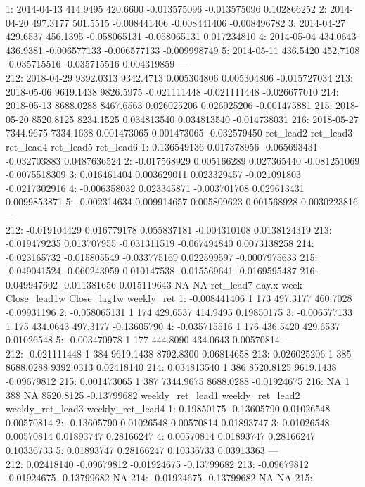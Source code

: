 \documentclass[
]{article}
\begin{document}
1: 2014-04-13 414.9495 420.6600 -0.013575096 -0.013575096 0.102866252 2:
2014-04-20 497.3177 501.5515 -0.008441406 -0.008441406 -0.008496782 3:
2014-04-27 429.6537 456.1395 -0.058065131 -0.058065131 0.017234810 4:
2014-05-04 434.0643 436.9381 -0.006577133 -0.006577133 -0.009998749 5:
2014-05-11 436.5420 452.7108 -0.035715516 -0.035715516 0.004319859 ---\\
212: 2018-04-29 9392.0313 9342.4713 0.005304806 0.005304806 -0.015727034
213: 2018-05-06 9619.1438 9826.5975 -0.021111448 -0.021111448
-0.026677010 214: 2018-05-13 8688.0288 8467.6563 0.026025206 0.026025206
-0.001475881 215: 2018-05-20 8520.8125 8234.1525 0.034813540 0.034813540
-0.014738031 216: 2018-05-27 7344.9675 7334.1638 0.001473065 0.001473065
-0.032579450 ret\_lead2 ret\_lead3 ret\_lead4 ret\_lead5 ret\_lead6 1:
0.136549136 0.017378956 -0.065693431 -0.032703883 0.0487636524 2:
-0.017568929 0.005166289 0.027365440 -0.081251069 -0.0075518309 3:
0.016461404 0.003629011 0.023329457 -0.021091803 -0.0217302916 4:
-0.006358032 0.023345871 -0.003701708 0.029613431 0.0099853871 5:
-0.002314634 0.009914657 0.005809623 0.001568928 0.0030223816 ---\\
212: -0.019104429 0.016779178 0.055837181 -0.004310108 0.0138124319 213:
-0.019479235 0.013707955 -0.031311519 -0.067494840 0.0073138258 214:
-0.023165732 -0.015805549 -0.033775169 0.022599597 -0.0007975633 215:
-0.049041524 -0.060243959 0.010147538 -0.015569641 -0.0169595487 216:
0.049947602 -0.011381656 0.015119643 NA NA ret\_lead7 day.x week
Close\_lead1w Close\_lag1w weekly\_ret 1: -0.008441406 1 173 497.3177
460.7028 -0.09931196 2: -0.058065131 1 174 429.6537 414.9495 0.19850175
3: -0.006577133 1 175 434.0643 497.3177 -0.13605790 4: -0.035715516 1
176 436.5420 429.6537 0.01026548 5: -0.003470978 1 177 444.8090 434.0643
0.00570814 ---\\
212: -0.021111448 1 384 9619.1438 8792.8300 0.06814658 213: 0.026025206
1 385 8688.0288 9392.0313 0.02418140 214: 0.034813540 1 386 8520.8125
9619.1438 -0.09679812 215: 0.001473065 1 387 7344.9675 8688.0288
-0.01924675 216: NA 1 388 NA 8520.8125 -0.13799682 weekly\_ret\_lead1
weekly\_ret\_lead2 weekly\_ret\_lead3 weekly\_ret\_lead4 1: 0.19850175
-0.13605790 0.01026548 0.00570814 2: -0.13605790 0.01026548 0.00570814
0.01893747 3: 0.01026548 0.00570814 0.01893747 0.28166247 4: 0.00570814
0.01893747 0.28166247 0.10336733 5: 0.01893747 0.28166247 0.10336733
0.03913363 ---\\
212: 0.02418140 -0.09679812 -0.01924675 -0.13799682 213: -0.09679812
-0.01924675 -0.13799682 NA 214: -0.01924675 -0.13799682 NA NA 215:
\end{document}
